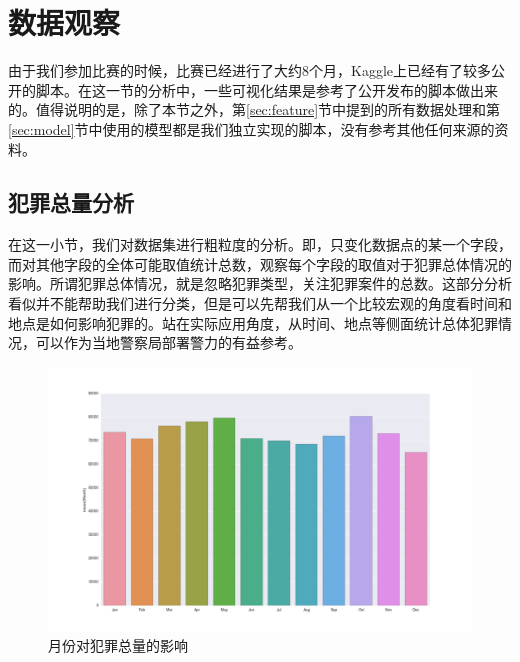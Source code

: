 \section{数据观察}
\label{sec:observation}

由于我们参加比赛的时候，比赛已经进行了大约8个月，Kaggle上已经有了较多公开的脚本。在这一节的分析中，一些可视化结果是参考了公开发布的脚本做出来的。值得说明的是，除了本节之外，第\ref{sec:feature}节中提到的所有数据处理和第\ref{sec:model}节中使用的模型都是我们独立实现的脚本，没有参考其他任何来源的资料。

\subsection{犯罪总量分析}

在这一小节，我们对数据集进行粗粒度的分析。即，只变化数据点的某一个字段，而对其他字段的全体可能取值统计总数，观察每个字段的取值对于犯罪总体情况的影响。所谓犯罪总体情况，就是忽略犯罪类型，关注犯罪案件的总数。这部分分析看似并不能帮助我们进行分类，但是可以先帮我们从一个比较宏观的角度看时间和地点是如何影响犯罪的。站在实际应用角度，从时间、地点等侧面统计总体犯罪情况，可以作为当地警察局部署警力的有益参考。

\begin{figure}[tb]
    \centering
    \includegraphics[width=1.0\linewidth]{fig/monthly}
    \caption{月份对犯罪总量的影响}
    \label{fig:monthly}
\end{figure}

